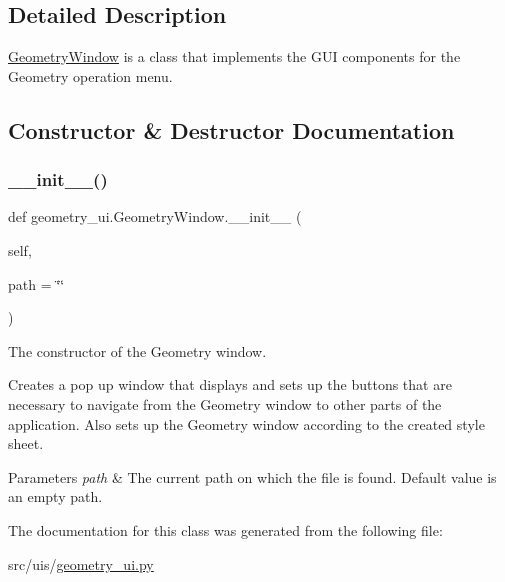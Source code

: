 \subsection{Detailed Description}
\hyperlink{classgeometry__ui_1_1_geometry_window}{Geometry\+Window} is a class that implements the G\+UI components for the Geometry operation menu. 

\subsection{Constructor \& Destructor Documentation}
\mbox{\label{classgeometry__ui_1_1_geometry_window_af619e3ecabaa9592f6de5987e31a27d3}} 
\subsubsection{\texorpdfstring{\+\_\+\+\_\+init\+\_\+\+\_\+()}{\_\_init\_\_()}}
{\footnotesize\ttfamily def geometry\+\_\+ui.\+Geometry\+Window.\+\_\+\+\_\+init\+\_\+\+\_\+ (\begin{DoxyParamCaption}\item[{}]{self,  }\item[{}]{path = {\ttfamily \char`\"{}\char`\"{}} }\end{DoxyParamCaption})}



The constructor of the Geometry window. 

Creates a pop up window that displays and sets up the buttons that are necessary to navigate from the Geometry window to other parts of the application. Also sets up the Geometry window according to the created style sheet. 
\begin{DoxyParams}{Parameters}
{\em path} & The current path on which the file is found. Default value is an empty path. \\
\hline
\end{DoxyParams}


The documentation for this class was generated from the following file\+:\begin{DoxyCompactItemize}
\item 
src/uis/\hyperlink{geometry__ui_8py}{geometry\+\_\+ui.\+py}\end{DoxyCompactItemize}
